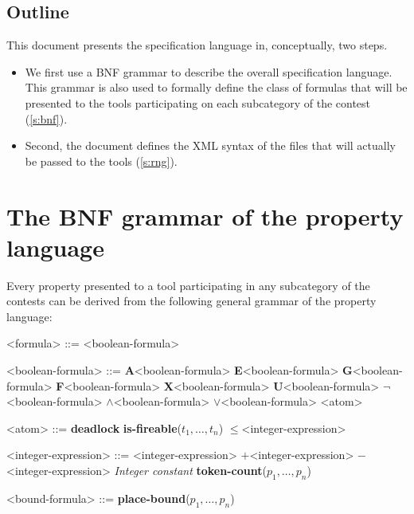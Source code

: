 \documentclass[10pt,english,a4paper]{article}
\makeatletter
\newcommand\ctla             {\textbf{A}\xspace}
\newcommand\ctle             {\textbf{E}\xspace}
\newcommand\ltlf             {\textbf{F}\xspace}
\newcommand\ltlg             {\textbf{G}\xspace}
\newcommand\ltlx             {\textbf{X}\xspace}
\newcommand\ltlu             {\textbf{U}\xspace}
\newcommand\logicnot         {\boldmath$\lnot$\xspace}
\newcommand\logicand         {\boldmath$\land$\xspace}
\newcommand\logicor          {\boldmath$\lor$\xspace}
\newcommand\atomleq          {\boldmath$\leq$\xspace}
\newcommand\atomdead         {\textbf{deadlock}\xspace}
\newcommand\atomisfire[1]    {\textbf{is-fireable}(#1)}
\newcommand\atomplacebnd[1]  {\textbf{place-bound}(#1)}
\newcommand\atomtokenscnt[1] {\textbf{token-count}(#1)}
\newcommand\exprplus         {\boldmath$+$\xspace}
\newcommand\exprminus        {\boldmath$-$\xspace}
\newcommand{\mcc}[0]{MCC}
\newcommand{\mccl}[0]{Model Checking Contest @ Petri Nets}
\newcommand\mysection[1]{\color{sectioncolor}\section{#1}\color{defaultcolor}}
\newcommand\mysubsection[1]{\color{sectioncolor}\subsection{#1}\color{defaultcolor}}
\makeatother
\begin{document}

\mysubsection{Outline}

This document presents the specification language in, conceptually, two steps.
\begin{itemize}
\item
  We first use a BNF grammar to describe the overall specification
  language.  This grammar is also used to formally define the class of
  formulas that will be presented to the tools participating on each
  subcategory of the contest (\cref{s:bnf}).
\item
  Second, the document defines the XML syntax of the files that will
  actually be passed to the tools (\cref{s:rng}).
\end{itemize}


\mysection{The BNF grammar of the property language}
\label{s:bnf}

Every property presented to a tool participating in any subcategory of the
contests can be derived from the following general grammar of the
property language:

\begin{grammar}
<formula> ::= <boolean-formula>

<boolean-formula> ::= \ctla <boolean-formula>
\alt \ctle <boolean-formula>
\alt \ltlg <boolean-formula>
\alt \ltlf <boolean-formula>
\alt \ltlx <boolean-formula>
 \ltlu <boolean-formula>
\alt \logicnot <boolean-formula>
 \logicand <boolean-formula>
 \logicor <boolean-formula>
\alt <atom>

<atom> ::= \atomdead
\alt \atomisfire{$t_1, \ldots, t_n$}
 \atomleq <integer-expression>

<integer-expression> ::=
     <integer-expression> \exprplus <integer-expression>
 \exprminus <integer-expression>
\alt \textit{Integer constant}
\alt \atomtokenscnt{$p_1, \ldots, p_n$}

<bound-formula> ::= \atomplacebnd{$p_1, \ldots, p_n$}

\end{grammar}
\end{document}
